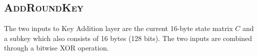 \subsection{\textsc{AddRoundKey}}

The two inputs to Key Addition layer are the current 16-byte state matrix $C$ and a subkey which also consists of 16 bytes (128 bits).
The two inputs are combined through a bitwise XOR operation.

